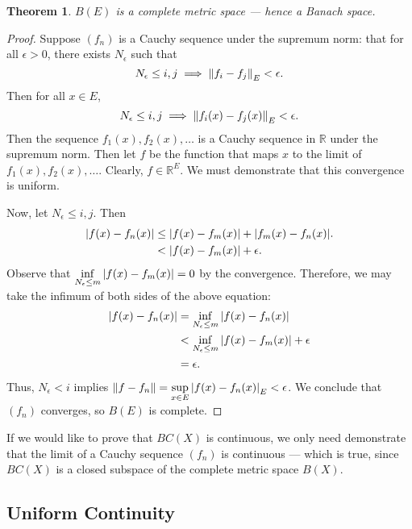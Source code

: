 \documentclass[11pt]{article}
\newtheorem{theorem}{Theorem}
\begin{document}
\begin{theorem}
	$B(E)$ is a complete metric space --- hence a Banach space.
\end{theorem}
\begin{adjustwidth}{1cm}{}
	\begin{proof}
		Suppose $(f_{n})$ is a Cauchy sequence under the supremum norm: that for all $\epsilon > 0$, there exists $N_{\epsilon}$ such that
		\[
			N_{\epsilon} \le i, j \implies \norm{f_{i} - f_{j}}_{E} < \epsilon.
		\]
		Then for all $x \in E$,
		\[
			N_{\epsilon} \le i, j \implies \norm{f_{i}(x) - f_{j}(x)}_{E} < \epsilon.
		\]
		Then the sequence $f_{1}(x), f_{2}(x), \ldots$ is a Cauchy sequence in $\mathbb{R}$ under the supremum norm. Then let $f$ be the function that maps $x$ to the limit of $f_{1}(x), f_{2}(x), \ldots$. Clearly, $f \in \mathbb{R}^{E}$. We must demonstrate that this convergence is uniform.
		
		Now, let $N_{\epsilon} \le i, j$. Then
		\begin{align*}
			\abs{f(x) - f_{n}(x)} &\le \abs{f(x) - f_{m}(x)} + \abs{f_{m}(x) - f_{n}(x)}. \\
			&< \abs{f(x) - f_{m}(x)} + \epsilon.
		\end{align*}
		Observe that $\inf\limits_{N_{\epsilon} \le m} \abs{f(x) - f_{m}(x)} = 0$ by the convergence. Therefore, we may take the infimum of both sides of the above equation:
		\begin{align*}
			\abs{f(x) - f_{n}(x)} &= \inf\limits_{N_{\epsilon} \le m} \abs{f(x) - f_{n}(x)} \\
			&< \inf\limits_{N_{\epsilon} \le m} \abs{f(x) - f_{m}(x)} + \epsilon \\
			&= \epsilon.
		\end{align*}
		Thus, $N_{\epsilon} < i$ implies $\norm{f - f_{n}} = \sup\limits_{x \in E} \abs{f(x) - f_{n}(x)}_{E} < \epsilon$. We conclude that $(f_{n})$ converges, so $B(E)$ is complete.
	\end{proof}
\end{adjustwidth}

If we would like to prove that $BC(X)$ is continuous, we only need demonstrate that the limit of a Cauchy sequence $(f_{n})$ is continuous --- which is true, since $BC(X)$ is a closed subspace of the complete metric space $B(X)$.

\subsection{Uniform Continuity}
\end{document}
